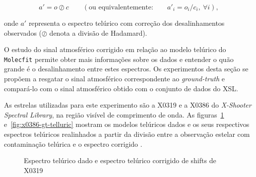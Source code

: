 \begin{equation*}
    a' = o \oslash c \qquad \left(\mbox{ou equivalentemente:} \qquad a'_{i} = o_i / c_i,\ \forall i\right),
\end{equation*}

\noindent onde $a'$ representa o espectro telúrico com correção dos desalinhamentos observados ($\oslash$ denota a divisão de Hadamard).

O estudo do sinal atmosférico corrigido em relação ao modelo telúrico do \texttt{Molecfit} permite obter mais informações sobre os dados e entender o quão grande é o desalinhamento entre estes espectros. Os experimentos desta seção se propõem a resgatar o sinal atmosférico correspondente ao \textit{ground-truth} e compará-lo com o sinal atmosférico obtido com o conjunto de dados do XSL.

As estrelas utilizadas para este experimento são a X0319 e a X0386 do \textit{X-Shooter Spectral Library}, na região visível de comprimento de onda. As figuras~\ref{fig:x0319-gt-telluric} e~\ref{fig:x0386-gt-telluric} mostram os modelos telúricos dados e os seus respectivos espectros telúricos realinhados a partir da divisão entre a observação estelar com contaminação telúrica e o espectro corrigido \citep{unpublished-xshooter-data-release}.

\begin{figure}[htb]
  \centering
  \hfill
  \caption{Espectro telúrico dado e espectro telúrico corrigido de shifts de X0319}
  \label{fig:x0319-gt-telluric}
\end{figure}

